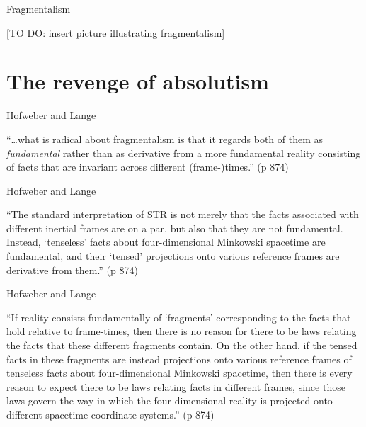 \documentclass[fleqn]{beamer}
\begin{document}
\begin{frame}{Fragmentalism}


[TO DO: insert picture illustrating fragmentalism]

\end{frame}



\section{The revenge of absolutism}



\begin{frame}{Hofweber and Lange}

  ``\dots what is radical about fragmentalism is that it regards both
  of them as \textit{fundamental} rather than as derivative from a
  more fundamental reality consisting of facts that are invariant
  across different (frame-)times.'' (p 874)

\end{frame}

\begin{frame}{Hofweber and Lange}

  ``The standard interpretation of STR is not merely that the facts
  associated with different inertial frames are on a par, but also
  that they are not fundamental. Instead, `tenseless' facts about
  four-dimensional Minkowski spacetime are fundamental, and their
  `tensed' projections onto various reference frames are derivative
  from them.'' (p 874)

\end{frame}

\begin{frame}{Hofweber and Lange}

  ``If reality consists fundamentally of `fragments' corresponding to
  the facts that hold relative to frame-times, then there is no reason
  for there to be laws relating the facts that these different
  fragments contain. On the other hand, if the tensed facts in these
  fragments are instead projections onto various reference frames of
  tenseless facts about four-dimensional Minkowski spacetime, then
  there is every reason to expect there to be laws relating facts in
  different frames, since those laws govern the way in which the
  four-dimensional reality is projected onto different spacetime
  coordinate systems.'' (p 874)

\end{frame}
\end{document}
